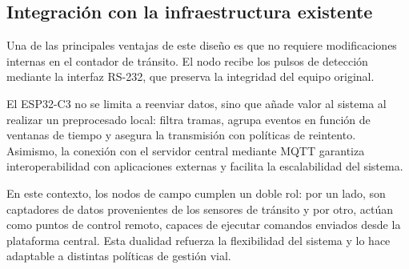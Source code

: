 \subsection{Integración con la infraestructura existente}
Una de las principales ventajas de este diseño es que no requiere modificaciones internas en el contador de tránsito. El nodo recibe los pulsos de detección mediante la interfaz RS-232, que preserva la integridad del equipo original. 

El ESP32-C3 no se limita a reenviar datos, sino que añade valor al sistema al realizar un preprocesado local: filtra tramas, agrupa eventos en función de ventanas de tiempo y asegura la transmisión con políticas de reintento. Asimismo, la conexión con el servidor central mediante MQTT garantiza interoperabilidad con aplicaciones externas y facilita la escalabilidad del sistema.

En este contexto, los nodos de campo cumplen un doble rol: por un lado, son captadores de datos provenientes de los sensores de tránsito y por otro, actúan como puntos de control remoto, capaces de ejecutar comandos enviados desde la plataforma central. Esta dualidad refuerza la flexibilidad del sistema y lo hace adaptable a distintas políticas de gestión vial.




